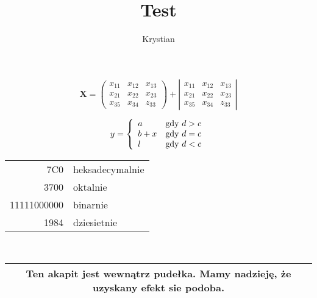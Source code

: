 \documentclass[12pt, a4paper]{article}
\author{Krystian}
\title{Test}
\begin{document}
	$$
	\mathbf{X} =
	\left( \begin{array}{ccc}
	x_{11} & x_{12} & x_{13} \\
	x_{21} & x_{22} & x_{23} \\
	x_{35} & x_{34} & z_{33}
	\end{array} \right)
	+
	\left| \begin{array}{ccc}
	x_{11} & x_{12} & x_{13} \\
	x_{21} & x_{22} & x_{23} \\
	x_{35} & x_{34} & z_{33}
	\end{array} \right|
	$$ 
	
	$$
	y = \left\{ \begin{array}{ll}
	a & \textrm{gdy $d>c$}\\
	b+x & \textrm{gdy $d=c$}\\
	l & \textrm{gdy $ d < c $}
	\end{array} \right.
	$$
	
	\begin{tabular}{|r|l|} \hline %
		7C0 & heksadecymalnie \\
		3700 & oktalnie \\
		11111000000 & binarnie \\
		\hline \hline
		1984 & dziesietnie \\ \hline
	\end{tabular}
		\\
	
		\begin{tabular}{|c|} \hline
			Ten akapit jest wewnątrz pudełka.
			Mamy nadzieję, że uzyskany
			efekt sie podoba.\\ \hline
		
	\end{tabular}
\end{document}
